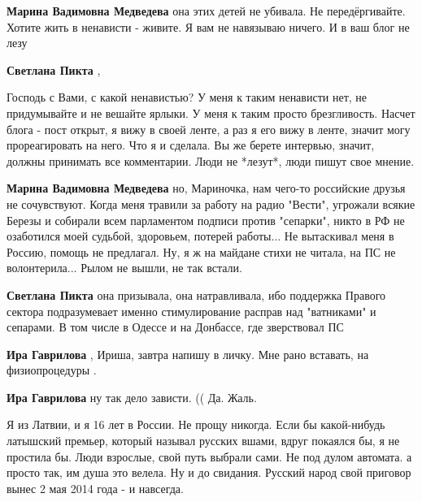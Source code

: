 \begin{itemize}
\begin{itemize}
\textbf{Марина Вадимовна Медведева} она этих детей не убивала. Не передёргивайте. Хотите жить в ненависти - живите. Я вам не навязываю ничего. И в ваш блог не лезу

\textbf{Светлана Пикта} , 

Господь с Вами, с какой ненавистью? У меня к таким ненависти нет, не
придумывайте и не вешайте ярлыки. У меня к таким просто брезгливость. Насчет
блога - пост открыт, я вижу в своей ленте, а раз я его вижу в ленте, значит
могу прореагировать на него. Что я и сделала. Вы же берете интервью, значит,
должны принимать все комментарии. Люди не *лезут*, люди пишут свое мнение.


\textbf{Марина Вадимовна Медведева} но, Мариночка, нам чего-то российские
друзья не сочувствуют. Когда меня травили за работу на радио "Вести", угрожали
всякие Березы и собирали всем парламентом подписи против "сепарки", никто в РФ
не озаботился моей судьбой, здоровьем, потерей работы... Не вытаскивал меня в
Россию, помощь не предлагал. Ну, я ж на майдане стихи не читала, на ПС не
волонтерила... Рылом не вышли, не так встали.

\textbf{Светлана Пикта} она призывала, она натравливала, ибо поддержка Правого сектора подразумевает именно стимулирование расправ над "ватниками" и сепарами. В том числе в Одессе и на Донбассе, где зверствовал ПС

\textbf{Ира Гаврилова} , Ириша, завтра напишу в личку. Мне рано вставать, на физиопроцедуры .

\textbf{Ира Гаврилова} ну так дело зависти. (( Да. Жаль.

\end{itemize} %


Я из Латвии, и я 16 лет в России. Не прощу никогда. Если бы какой-нибудь
латышский премьер, который называл русских вшами, вдруг покаялся бы, я не
простила бы. Люди взрослые, свой путь выбрали сами. Не под дулом автомата. а
просто так, им душа это велела. Ну и до свидания. Русский народ свой приговор
вынес 2 мая 2014 года - и навсегда.


\end{itemize}
